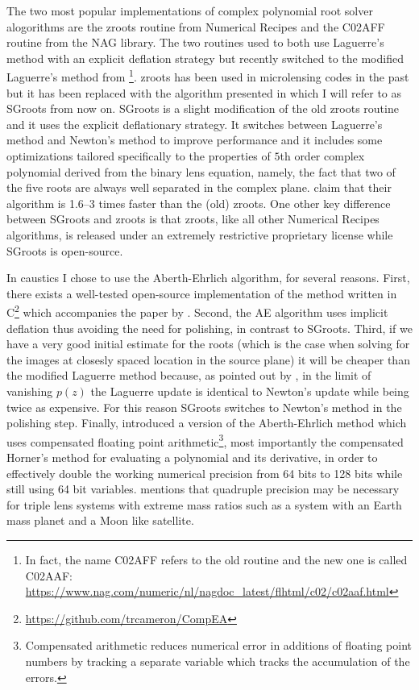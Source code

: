 \documentclass[12pt,dvipsnames]{report}
\newcommand{\ssf}[1]{\textsf{#1}}
\begin{document}
The two most popular implementations of complex polynomial root solver alogorithms are
the \ssf{zroots} routine from Numerical Recipes \citep{1992nrca.book.....P} and the
\ssf{C02AFF} routine from the NAG library. The two routines used to both use
Laguerre's method with an explicit deflation strategy but recently switched to the 
modified Laguerre's method from \citet{cameron2019}\footnote{In fact, the name
    \ssf{C02AFF} refers to the old routine and the new one is called \ssf{C02AAF}:
    \url{https://www.nag.com/numeric/nl/nagdoc_latest/flhtml/c02/c02aaf.html}}. 
   \ssf{zroots}  has been used in microlensing codes in the past but it has  been replaced
   with the algorithm presented in \citet{2012arXiv1203.1034S}
which I will refer to as \ssf{SGroots} from now on. \ssf{SGroots} is a slight
modification of the old \ssf{zroots} routine and it uses the explicit deflationary
strategy. It switches between Laguerre's method and Newton's method to improve
performance and it includes some optimizations tailored specifically to the
properties of $5$th order complex polynomial derived from the binary lens equation, 
namely, the fact that two of the five roots are always well separated in the complex plane. 
\citet{2012arXiv1203.1034S} claim that their algorithm is
1.6--3 times faster than the (old) \ssf{zroots}. One other key difference between 
\ssf{SGroots} and \ssf{zroots} is that \ssf{zroots}, like all other Numerical Recipes 
algorithms, is released under an extremely restrictive proprietary license while 
\ssf{SGroots} is open-source.

In \ssf{caustics} I chose to use the Aberth-Ehrlich algorithm, for several 
reasons. First, there exists a well-tested open-source implementation of the method written 
in \ssf{C}\footnote{\url{https://github.com/trcameron/CompEA}} which accompanies the paper 
by \citet{cameron2021}. Second, the AE algorithm uses implicit deflation thus  avoiding the 
need for polishing, in contrast to \ssf{SGroots}. Third, if we have a very good initial 
estimate for the roots (which is the case when solving for the images at closesly spaced 
location in the source plane) it will be cheaper than the  modified Laguerre method because, 
as pointed out by \citet{2012arXiv1203.1034S}, in the limit of vanishing $p(z)$ the 
Laguerre update is identical to Newton's update while being twice as expensive.
For this reason \ssf{SGroots} switches to Newton's method in the polishing step. Finally,
\citet{cameron2021} introduced a version of the Aberth-Ehrlich method which uses
compensated floating point arithmetic\footnote{Compensated arithmetic reduces  numerical
error in additions of floating point numbers by tracking a separate variable which tracks 
the accumulation of the errors.}, most importantly the compensated Horner's method 
for evaluating a polynomial and its derivative, in order to effectively double the 
working numerical precision from 64 bits to 128 bits while still using 64 bit variables.
\citet{2010ApJ...716.1408B} mentions that quadruple precision may be necessary
for triple lens systems with extreme mass ratios such as a system with an Earth
mass planet and a Moon like satellite.
\end{document}
